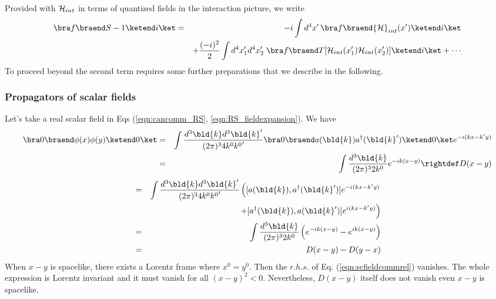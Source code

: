 Provided with ${\cal H}_{int}$ in terms of quantized fields in the interaction picture, 
we write 
\begin{eqnarray}
\bra f \braend S -1 \ketend i \ket
&=&
 -i \int d^4 x' \, \bra f \braend {\cal H}_{int}(x') \ketend i \ket
\nonumber\\
&&+
\frac{(-i)^2}{2}
\int d^4 x_1' d^4 x_2'
\;\bra f \braend T[ {\cal H}_{int}(x_1') {\cal H}_{int}(x_2')] \ketend i \ket
+ \cdots
\nonumber\\
\label{eqn:SmatrixPertSerCov}
\end{eqnarray}
To proceed beyond the second term requires some further preparations
that we describe in the following.

\subsubsection{Propagators of scalar fields}
Let's take a real scalar field in Eqs (\ref{eqn:cancomm_RS}, \ref{eqn:RS_fieldexpansion}).
We have
\begin{eqnarray}
\bra 0 \braend \phi(x) \phi(y) \ketend 0 \ket
&=&
\int \frac{d^3 \bld{k} d^3 \bld{k}'}{(2\pi)^3 4 k^0 {k^0}'} 
\bra 0 \braend a(\bld{k}) a^\dagger(\bld{k}') \ketend 0 \ket
e^{-i(kx - k'y)}
\nonumber\\
&=&
\int \frac{d^3 \bld{k} }{(2\pi)^3 2 k^0} 
e^{-ik(x - y)}
\rightdef
D(x-y)
\end{eqnarray}
\begin{eqnarray}
[\phi(x), \phi(y)]
&=&
\int \frac{d^3 \bld{k} d^3 \bld{k}'}{(2\pi)^3 4 k^0 {k^0}'} 
\left(
[a(\bld{k}), a^\dagger(\bld{k}')]e^{-i(kx - k'y)}
\right.
\nonumber\\
&&
\left.
\hspace{35mm}
+
[a^\dagger(\bld{k}), a(\bld{k}')]e^{i(kx - k'y)}
\right)
\nonumber\\
&=&
\int \frac{d^3 \bld{k} }{(2\pi)^3 2 k^0} 
\left(
e^{-ik(x - y)} - e^{ik(x - y)}
\right)
\nonumber\\
&=&
D(x-y) - D(y-x)
\label{eqn:scfieldcommrel}
\end{eqnarray}
When $x-y$ is spacelike, there exists a Lorentz frame where $x^0 = y^0$.
Then the $r.h.s.$ of Eq. (\ref{eqn:scfieldcommrel}) vanishes. 
The whole expression is Lorentz invariant and it must vanish for all $(x-y)^2 < 0$.
Nevertheless, $D(x-y)$ itself does not vanish even $x-y$ is spacelike.

